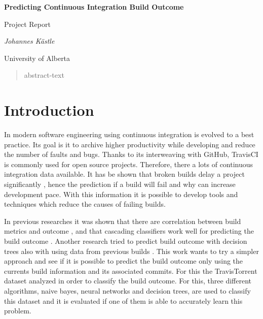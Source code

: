 \documentclass[a4paper,11pt]{article}
\begin{document}
	
	\begin{center}
	{\huge\bfseries Predicting Continuous Integration Build Outcome \par}
	{\Large Project Report\par}
	
	\vspace{1cm}
	{\Large\itshape Johannes Kästle\par}
	{ University of Alberta \par}
	\end{center}


\setlength{\parindent}{0pt}
\setlength{\parskip}{1.5ex plus0.5ex minus0.5ex}

\begin{abstract}
	abstract-text %
\end{abstract}

\section{Introduction}

In modern software engineering using continuous integration is evolved to a best practice. Its goal is it to archive higher productivity while developing and reduce the number of faults and bugs. Thanks to its interweaving with GitHub, TravisCI is commonly used for open source projects. Therefore, there a lots of continuous integration data available. It has be shown that broken builds delay a project significantly \cite{CIDelay}, hence the prediction if a build will fail and why can increase development pace. With this information it is possible to develop tools and techniques which reduce the causes of failing builds. 

In previous researches it was shown that there are correlation between build metrics and outcome \cite{correlation}, and that cascading classifiers work well for predicting the build outcome \cite{cascade}. Another research tried to predict build outcome with decision trees also with using data from previous builds \cite{treeTimes}. This work wants to try a simpler approach and see if it is possible to predict the build outcome only using the currents build information and its associated commits. For this the TravisTorrent \cite{msr17challenge} dataset analyzed in order to classify the build outcome. For this, three different algorithms, naive bayes, neural networks and decision trees, are used to classify this dataset and it is evaluated if one of them is able to accurately learn this problem. 
\end{document}
